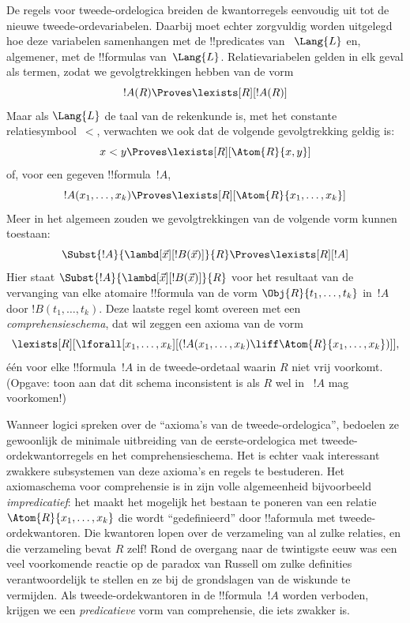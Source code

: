 \documentclass[openany]{memoir}
\begin{document}
De regels voor tweede-ordelogica breiden de kwantorregels eenvoudig uit tot
de nieuwe tweede-ordevariabelen. Daarbij moet echter zorgvuldig worden
uitgelegd hoe deze variabelen samenhangen met de !!{predicate}s van
~$\Lang{L}$ en, algemener, met de !!{formula}s van~$\Lang{L}$. Relatievariabelen
gelden in elk geval als termen, zodat we gevolgtrekkingen hebben van de vorm
\[
!A(R) \Proves \lexists[R][!A(R)]
\]
Maar als $\Lang{L}$ de taal van de rekenkunde is, met het constante
relatiesymbool~$<$, verwachten we ook dat de volgende gevolgtrekking geldig is:
\[
x < y \Proves \lexists[R][\Atom{R}{x,y}]
\]
of, voor een gegeven !!{formula}~$!A$,
\[
!A(x_1, \dots, x_k) \Proves \lexists[R][\Atom{R}{x_1,\dots,x_k}]
\]
Meer in het algemeen zouden we gevolgtrekkingen van de volgende vorm kunnen
toestaan:
\[
\Subst{!A}{\lambd[\vec x][!B(\vec x)]}{R} \Proves
\lexists[R][!A]
\]
Hier staat $\Subst{!A}{\lambd[\vec x][!B(\vec x)]}{R}$ voor het resultaat
van de vervanging van elke atomaire !!{formula} van de vorm
$\Obj{R}{t_1,\dots,t_k}$ in~$!A$ door $!B(t_1, \dots, t_k)$. Deze laatste
regel komt overeen met een {\em comprehensieschema}, dat wil zeggen een
axioma van de vorm
\[
\lexists[R][\lforall[x_1, \dots, x_k][(!A(x_1, \dots, x_k) \liff
\Atom{R}{x_1, \dots, x_k})]],
\]
één voor elke !!{formula}~$!A$ in de tweede-ordetaal waarin $R$ niet vrij
voorkomt. (Opgave: toon aan dat dit schema inconsistent is als $R$ wel in
~$!A$ mag voorkomen!)

Wanneer logici spreken over de ``axioma's van de tweede-ordelogica'', bedoelen
ze gewoonlijk de minimale uitbreiding van de eerste-ordelogica met
tweede-ordekwantorregels en het comprehensieschema. Het is echter vaak
interessant zwakkere subsystemen van deze axioma's en regels te bestuderen.
Het axiomaschema voor comprehensie is in zijn volle algemeenheid bijvoorbeeld
\emph{impredicatief}: het maakt het mogelijk het bestaan te poneren van een
relatie $\Atom{R}{x_1, \dots, x_k}$ die wordt ``gedefinieerd'' door
!!a{formula} met tweede-ordekwantoren. Die kwantoren lopen over de verzameling
van al zulke relaties, en die verzameling bevat $R$ zelf!{} Rond de overgang
naar de twintigste eeuw was een veel voorkomende reactie op de paradox van
Russell om zulke definities verantwoordelijk te stellen en ze bij de
grondslagen van de wiskunde te vermijden. Als tweede-ordekwantoren in de
!!{formula}~$!A$ worden verboden, krijgen we een {\em predicatieve} vorm van
comprehensie, die iets zwakker is.
\end{document}
